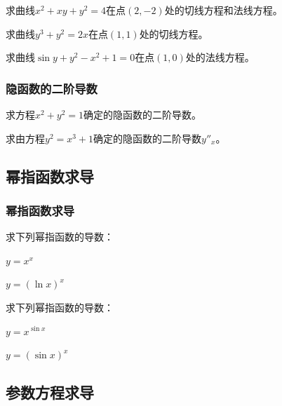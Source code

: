 \documentclass[14pt,notheorems,leqno,xcolor={rgb}]{beamer} %
\begin{document}
\begin{frame}
\begin{example}
求曲线$x^2+xy+y^2=4$在点$(2,-2)$处的切线方程和法线方程。
\end{example}
\vpause
\begin{exercise}
\begin{enumlite}
  \item 求曲线$y^3+y^2=2x$在点$(1,1)$处的切线方程。
  \item 求曲线$\sin y+y^2-x^2+1=0$在点$(1,0)$处的法线方程。
\end{enumlite}
\end{exercise}
\end{frame}

\begin{iframe}
\frametitle{隐函数的二阶导数}
\begin{example}
求方程$x^2+y^2=1$确定的隐函数的二阶导数。
\end{example}
\vpause
\begin{exercise}
求由方程$y^2=x^3+1$确定的隐函数的二阶导数$y''_x$。
\end{exercise}
\end{iframe}

\subsection{幂指函数求导}

\begin{frame}
\frametitle{幂指函数求导}
\begin{example}
求下列幂指函数的导数：
\begin{enumhalf}
  \item $y=x^x$ ~\pause
  \item $y=(\ln x)^x$ ~
\end{enumhalf}
\end{example}
\vpause
\begin{exercise}
求下列幂指函数的导数：
\begin{enumhalf}
  \item $y=x^{\sin x}$ ~\pause
  \item $y=(\sin x)^x$~
\end{enumhalf}
\end{exercise}
\end{frame}

\subsection{参数方程求导}
\end{document}
